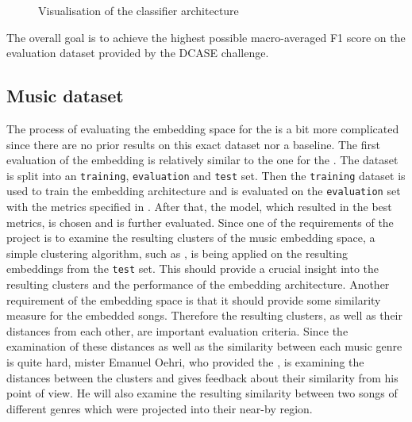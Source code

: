 \begin{figure}[htbp]
    \captionsetup{format=plain}
    \centering
    \caption{Visualisation of the classifier architecture}
    \label{fig:Classifier-DCASE-Visualisation}
\end{figure}
\noindent
The overall goal is to achieve the highest possible macro-averaged F1 score on the evaluation dataset provided by the DCASE challenge.

\subsection{Music dataset}
\label{sub:Eval-Music}
The process of evaluating the embedding space for the  is a bit more complicated since there are no prior results on this exact dataset nor a baseline. The first evaluation of the embedding is relatively similar to the one for the . The dataset is split into an \texttt{training}, \texttt{evaluation} and \texttt{test} set. Then the \texttt{training} dataset is used to train the embedding architecture and is evaluated on the \texttt{evaluation} set with the metrics specified in . After that, the model, which resulted in the best metrics, is chosen and is further evaluated.
\newline
\newline
Since one of the requirements of the project is to examine the resulting clusters of the music embedding space, a simple clustering algorithm, such as , is being applied on the resulting embeddings from the \texttt{test} set. This should provide a crucial insight into the resulting clusters and the performance of the embedding architecture.
\newline
\newline
Another requirement of the embedding space is that it should provide some similarity measure for the embedded songs. Therefore the resulting clusters, as well as their distances from each other, are important evaluation criteria. Since the examination of these distances as well as the similarity between each music genre is quite hard, mister Emanuel Oehri, who provided the , is examining the distances between the clusters and gives feedback about their similarity from his point of view. He will also examine the resulting similarity between two songs of different genres which were projected into their near-by region.

